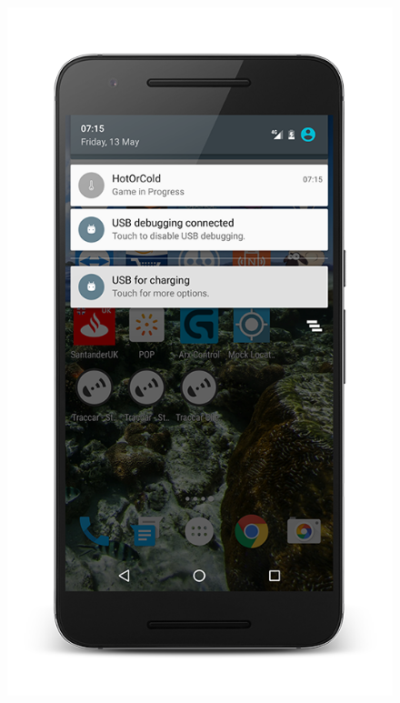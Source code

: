 \documentclass[10pt, a4paper]{article}
\begin{document}
\begin{figure}[!htb]
  \includegraphics[width=1.0\textwidth]{phone_notification_1}
  \caption{}
\endminipage\hfill
{}

\end{figure}
\end{document}

